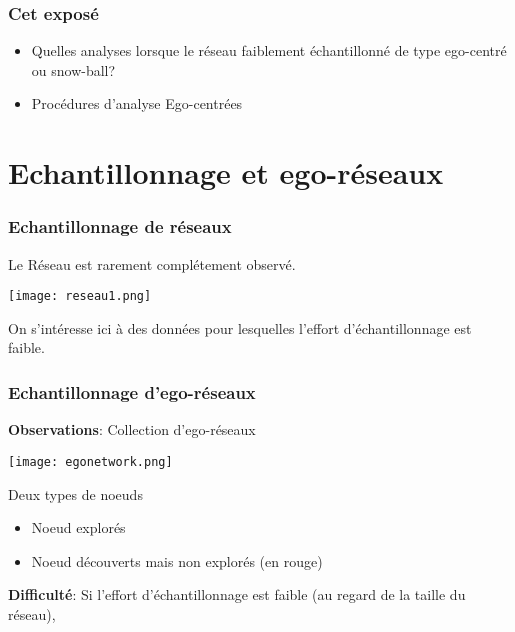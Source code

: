 \documentclass{beamer}
\begin{document}
\begin{frame}
\frametitle{Cet exposé }


\begin{itemize}
 \item Quelles analyses lorsque le réseau  {\color{red} faiblement échantillonné}  de type  {\color{red} ego-centré} ou {\color{red} snow-ball}? 
 \item Procédures d'analyse {\color{red} Ego-centrées}
\end{itemize}


 
\end{frame}


















\section{Echantillonnage et ego-réseaux}



\begin{frame}
\frametitle{Echantillonnage de réseaux} 
 
 Le Réseau est rarement  complétement observé.
 
 
 \begin{center}
 \texttt{[image: reseau1.png]}  
 \end{center}

 
 
 On s'intéresse ici à des données pour lesquelles l'effort d'échantillonnage est faible.
\end{frame}




\begin{frame}
 \frametitle{Echantillonnage d'ego-réseaux}
 
 {\bf Observations}: Collection d'ego-réseaux 
 
 \begin{center}
 \texttt{[image: egonetwork.png]}  
 \end{center}

 
 
 Deux types de noeuds
 \begin{itemize}
  \item Noeud explorés
  \item Noeud découverts mais non explorés (en rouge)
 \end{itemize}

{\bf Difficulté}: Si l'effort d'échantillonnage est faible (au regard de la taille du réseau), 
 
\end{frame}
\end{document}
